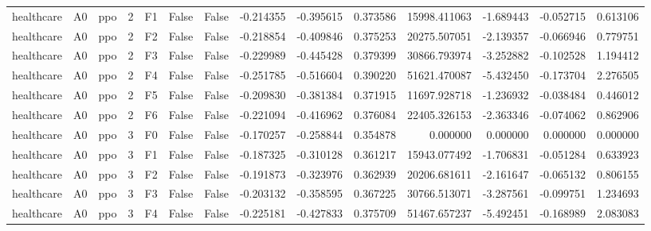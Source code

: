 \begin{tabular}{lllrlllrrrrrrr}
healthcare &      A0 &       ppo &     2 &  F1 &           False &            False & -0.214355 & -0.395615 & 0.373586 &     15998.411063 &          -1.689443 &       -0.052715 &            0.613106 \\
healthcare &      A0 &       ppo &     2 &  F2 &           False &            False & -0.218854 & -0.409846 & 0.375253 &     20275.507051 &          -2.139357 &       -0.066946 &            0.779751 \\
healthcare &      A0 &       ppo &     2 &  F3 &           False &            False & -0.229989 & -0.445428 & 0.379399 &     30866.793974 &          -3.252882 &       -0.102528 &            1.194412 \\
healthcare &      A0 &       ppo &     2 &  F4 &           False &            False & -0.251785 & -0.516604 & 0.390220 &     51621.470087 &          -5.432450 &       -0.173704 &            2.276505 \\
healthcare &      A0 &       ppo &     2 &  F5 &           False &            False & -0.209830 & -0.381384 & 0.371915 &     11697.928718 &          -1.236932 &       -0.038484 &            0.446012 \\
healthcare &      A0 &       ppo &     2 &  F6 &           False &            False & -0.221094 & -0.416962 & 0.376084 &     22405.326153 &          -2.363346 &       -0.074062 &            0.862906 \\
healthcare &      A0 &       ppo &     3 &  F0 &           False &            False & -0.170257 & -0.258844 & 0.354878 &         0.000000 &           0.000000 &        0.000000 &            0.000000 \\
healthcare &      A0 &       ppo &     3 &  F1 &           False &            False & -0.187325 & -0.310128 & 0.361217 &     15943.077492 &          -1.706831 &       -0.051284 &            0.633923 \\
healthcare &      A0 &       ppo &     3 &  F2 &           False &            False & -0.191873 & -0.323976 & 0.362939 &     20206.681611 &          -2.161647 &       -0.065132 &            0.806155 \\
healthcare &      A0 &       ppo &     3 &  F3 &           False &            False & -0.203132 & -0.358595 & 0.367225 &     30766.513071 &          -3.287561 &       -0.099751 &            1.234693 \\
healthcare &      A0 &       ppo &     3 &  F4 &           False &            False & -0.225181 & -0.427833 & 0.375709 &     51467.657237 &          -5.492451 &       -0.168989 &            2.083083 \\

\end{tabular}
